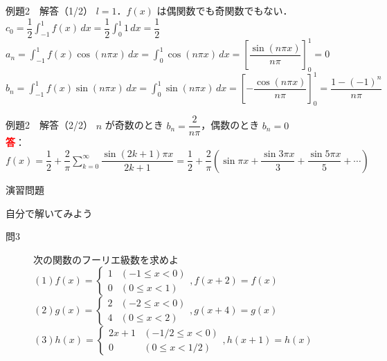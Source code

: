 \documentclass[professionalfonts]{beamer}
\begin{document}
\begin{frame}{例題2　解答（1/2）}
  $l=1$．$f(x)$ は偶関数でも奇関数でもない．\\[4pt]
  $c_{0} = \dfrac{1}{2}\displaystyle\int_{-1}^{1} f(x)\,dx = \dfrac{1}{2}\int_{0}^{1} 1\,dx = \dfrac{1}{2}$\\[6pt]
  $a_{n} = \displaystyle\int_{-1}^{1} f(x)\cos(n\pi x)\,dx = \int_{0}^{1}\cos(n\pi x)\,dx = \left[\dfrac{\sin(n\pi x)}{n\pi}\right]_{0}^{1} = 0$\\[6pt]
  $b_{n} = \displaystyle\int_{-1}^{1} f(x)\sin(n\pi x)\,dx = \int_{0}^{1}\sin(n\pi x)\,dx = \left[-\dfrac{\cos(n\pi x)}{n\pi}\right]_{0}^{1} = \dfrac{1-(-1)^{n}}{n\pi}$
\end{frame}

\begin{frame}{例題2　解答（2/2）}
  $n$ が奇数のとき $b_{n} = \dfrac{2}{n\pi}$，偶数のとき $b_{n} = 0$
  \\[8pt]\textcolor{red}{\textbf{答}}：$f(x) = \dfrac{1}{2} + \dfrac{2}{\pi}\displaystyle\sum_{k=0}^{\infty} \dfrac{\sin(2k+1)\pi x}{2k+1} = \dfrac{1}{2} + \dfrac{2}{\pi}\!\left(\sin\pi x + \dfrac{\sin 3\pi x}{3} + \dfrac{\sin 5\pi x}{5} + \cdots\right)$
\end{frame}

\begin{frame}{演習問題}
  \begin{exampleblock}{自分で解いてみよう}
  \begin{description}
    \item[問3] 次の関数のフーリエ級数を求めよ
    $(1) f(x) = \begin{cases} 1 & (-1 \leq x < 0) \\ 0 & (0 \leq x < 1) \end{cases},  f(x+2) = f(x)$\\
    $(2) g(x) = \begin{cases} 2 & (-2 \leq x < 0) \\ 4 & (0 \leq x < 2) \end{cases},  g(x+4) = g(x)$\\
    $(3) h(x) = \begin{cases} 2x+1 & (-1/2 \leq x < 0) \\ 0 & (0 \leq x < 1/2) \end{cases},  h(x+1) = h(x)$\\
  \end{description}
  \end{exampleblock}
\end{frame}
\end{document}
